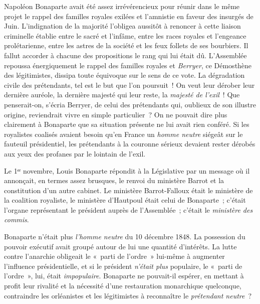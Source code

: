 \documentclass[twoside]{book} %
\begin{document}
Napoléon Bonaparte avait été assez irrévérencieux pour réunir dans le même projet le rappel des familles royales exilées et l’amnistie en faveur des insurgés de Juin. L’indignation de la majorité l’obligea aussitôt à renoncer à cette liaison criminelle établie entre le sacré et l’infâme, entre les races royales et l’engeance prolétarienne, entre les astres de la société et les feux follets de ses bourbiers. Il fallut accorder à chacune des propositions le rang qui lui était dû. L’Assemblée repoussa énergiquement le rappel des familles royales et \emph{Berryer}, ce Démosthène des légitimistes, dissipa toute équivoque sur le sens de ce vote. La dégradation civile des prétendants, tel est le but que l’on poursuit ! On veut leur dérober leur dernière auréole, la dernière majesté qui leur reste, la \emph{majesté de l’exil} ! Que penserait-on, s’écria Berryer, de celui des prétendants qui, oublieux de son illustre origine, reviendrait vivre en simple particulier ? On ne pouvait dire plus clairement à Bonaparte que sa situation présente ne lui avait rien conféré. Si les royalistes coalisés avaient besoin qu’en France un \emph{homme neutre} siégeât sur le fauteuil présidentiel, les prétendants à la couronne sérieux devaient rester dérobés aux yeux des profanes par le lointain de l’exil.\par
Le 1ᵉʳ novembre, Louis Bonaparte répondit à la Législative par un message où il annonçait, en termes assez brusques, le renvoi du ministère Barrot et la constitution d’un autre cabinet. Le ministère Barrot-Falloux était le ministère de la coalition royaliste, le ministère d’Hautpoul était celui de Bonaparte ; c’était l’organe représentant le président auprès de l’Assemblée ; c’était le \emph{ministère des commis}.\par
Bonaparte n’était plus \emph{l’homme neutre} du 10 décembre 1848. La possession du pouvoir exécutif avait groupé autour de lui une quantité d’intérêts. La lutte contre l’anarchie obligeait le « parti de l’ordre » lui-même à augmenter l’influence présidentielle, et si le président \emph{n’était plus} populaire, le « parti de l’ordre », lui, était \emph{impopulaire}. Bonaparte ne pouvait-il espérer, en mettant à profit leur rivalité et la nécessité d’une restauration monarchique quelconque, contraindre les orléanistes et les légitimistes à reconnaître le \emph{prétendant neutre} ?\par
\end{document}
